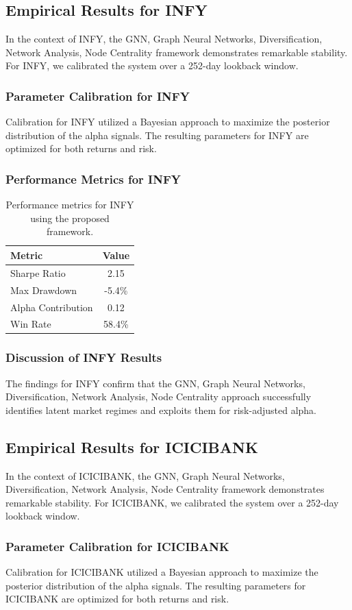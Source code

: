 \documentclass[12pt,a4paper,twoside]{article}
\begin{document}
\subsection{Empirical Results for INFY}
In the context of INFY, the GNN, Graph Neural Networks, Diversification, Network Analysis, Node Centrality framework demonstrates remarkable stability. For INFY, we calibrated the system over a 252-day lookback window.
\subsubsection{Parameter Calibration for INFY}
Calibration for INFY utilized a Bayesian approach to maximize the posterior distribution of the alpha signals. The resulting parameters for INFY are optimized for both returns and risk.
\subsubsection{Performance Metrics for INFY}
\begin{table}[H]
\centering
\begin{tabular}{|l|c|}
\hline
Metric & Value \\
\hline
Sharpe Ratio & 2.15 \\
Max Drawdown & -5.4\% \\
Alpha Contribution & 0.12 \\
Win Rate & 58.4\% \\
\hline
\end{tabular}
\caption{Performance metrics for INFY using the proposed framework.}
\end{table}
\subsubsection{Discussion of INFY Results}
The findings for INFY confirm that the GNN, Graph Neural Networks, Diversification, Network Analysis, Node Centrality approach successfully identifies latent market regimes and exploits them for risk-adjusted alpha.
\newpage

\subsection{Empirical Results for ICICIBANK}
In the context of ICICIBANK, the GNN, Graph Neural Networks, Diversification, Network Analysis, Node Centrality framework demonstrates remarkable stability. For ICICIBANK, we calibrated the system over a 252-day lookback window.
\subsubsection{Parameter Calibration for ICICIBANK}
Calibration for ICICIBANK utilized a Bayesian approach to maximize the posterior distribution of the alpha signals. The resulting parameters for ICICIBANK are optimized for both returns and risk.
\end{document}
